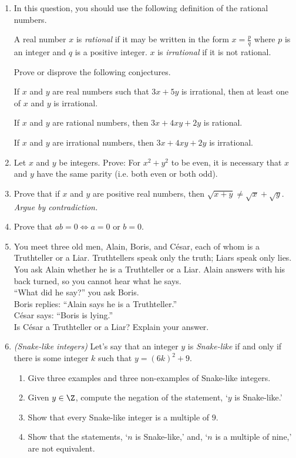 \begin{enumerate}
	\item In this question, you should use the following definition of the rational numbers.
		\begin{defn*}
  	A real number $x$ is \emph{rational} if it may be written in the form $x=\frac pq$ where $p$ is an integer and $q$ is a positive integer. $x$ is \emph{irrational} if it is not rational.
  	\end{defn*}
  	Prove or disprove the following conjectures.
  	\begin{conj*}[1]
			If $x$ and $y$ are real numbers such that $3x+5y$ is irrational, then at least one of $x$ and $y$ is irrational.
		\end{conj*}
  	\begin{conj*}[2]
			If $x$ and $y$ are rational numbers, then $3x+4xy+2y$ is rational.
		\end{conj*}
  	\begin{conj*}[3]
			If $x$ and $y$ are irrational numbers, then $3x+4xy+2y$ is irrational.
		\end{conj*}
	
	\item Let $x$ and $y$ be integers. Prove: For $x^2+y^2$ to be even, it is necessary that $x$ and $y$ have the same parity (i.e. both even or both odd).
 
	\item Prove that if $x$ and $y$ are positive real numbers, then $\sqrt{x+y}\neq\sqrt{x}+\sqrt{y}$. \emph{Argue by contradiction.}
	
	\item Prove that $ab=0\iff a=0$ or $b=0$.

  \item You meet three old men, Alain, Boris, and César, each of whom is a Truthteller or a Liar. Truthtellers speak only the truth; Liars speak only lies. You ask Alain whether he is a Truthteller or a Liar. Alain answers with his back turned, so you cannot hear what he says.\\[5pt]
``What did he say?'' you ask Boris.\\[5pt]
Boris replies: ``Alain says he is a Truthteller.''\\[5pt]
César says: ``Boris is lying.''\\[5pt]
Is César a Truthteller or a Liar? Explain your answer.\goodbreak
	
  \item \emph{(Snake-like integers)} Let's say that an integer $y$ is \textit{Snake-like} if and only if there is some integer $k$ such that $y=(6k)^2+9$.
	\begin{enumerate}
	  \item Give three examples and three non-examples of Snake-like integers. 
	  \item Given $y\in\Z$, compute the negation of the statement, `$y$ is Snake-like.'
	  \item Show that every Snake-like integer is a multiple of $9$.
	  \item Show that the statements, `$n$ is Snake-like,' and, `$n$ is a multiple of nine,' are not equivalent.
	\end{enumerate}
	

\end{enumerate}
